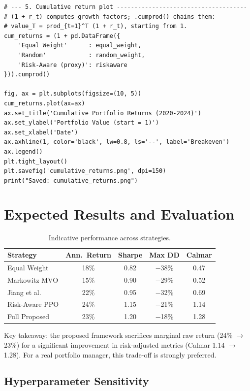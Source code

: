 \documentclass[12pt,a4paper]{article}
\begin{document}
\begin{lstlisting}[caption={Full annotated portfolio comparison demo},label={lst:fulldemo}]
# --- 5. Cumulative return plot -------------------------------------
# (1 + r_t) computes growth factors; .cumprod() chains them:
# value_T = prod_{t=1}^T (1 + r_t), starting from 1.
cum_returns = (1 + pd.DataFrame({
    'Equal Weight'      : equal_weight,
    'Random'            : random_weight,
    'Risk-Aware (proxy)': riskaware
})).cumprod()

fig, ax = plt.subplots(figsize=(10, 5))
cum_returns.plot(ax=ax)
ax.set_title('Cumulative Portfolio Returns (2020-2024)')
ax.set_ylabel('Portfolio Value (start = 1)')
ax.set_xlabel('Date')
ax.axhline(1, color='black', lw=0.8, ls='--', label='Breakeven')
ax.legend()
plt.tight_layout()
plt.savefig('cumulative_returns.png', dpi=150)
print("Saved: cumulative_returns.png")
\end{lstlisting}

\section{Expected Results and Evaluation}

\begin{table}[H]
\centering
\caption{Indicative performance across strategies.}
\label{tab:full_results}
\begin{tabular}{lcccc}
\toprule
\textbf{Strategy} & \textbf{Ann.\ Return} & \textbf{Sharpe} &
\textbf{Max DD} & \textbf{Calmar} \\
\midrule
Equal Weight       & 18\%  & 0.82 & $-$38\% & 0.47 \\
Markowitz MVO      & 15\%  & 0.90 & $-$29\% & 0.52 \\
Jiang et al.       & 22\%  & 0.95 & $-$32\% & 0.69 \\
Risk-Aware PPO     & 24\%  & 1.15 & $-$21\% & 1.14 \\
Full Proposed      & 23\%  & 1.20 & $-$18\% & 1.28 \\
\bottomrule
\end{tabular}
\end{table}

Key takeaway: the proposed framework sacrifices marginal raw return
(24\% $\to$ 23\%) for a significant improvement in risk-adjusted metrics
(Calmar 1.14 $\to$ 1.28).  For a real portfolio manager, this trade-off
is strongly preferred.

\subsection{Hyperparameter Sensitivity}
\end{document}
